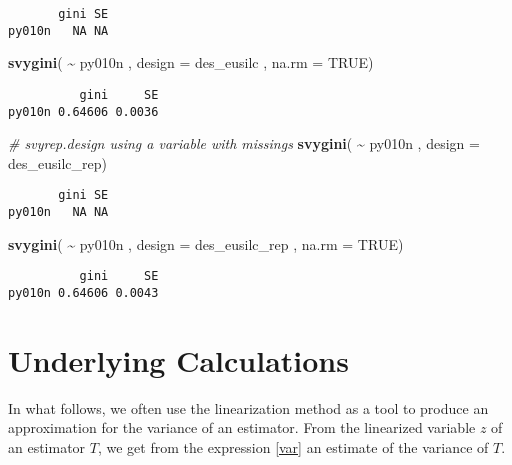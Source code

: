 \documentclass[
]{book}
\newenvironment{Shaded}{\begin{snugshade}}{\end{snugshade}}
\newcommand{\AttributeTok}[1]{\textcolor[rgb]{0.13,0.29,0.53}{#1}}
\newcommand{\CommentTok}[1]{\textcolor[rgb]{0.56,0.35,0.01}{\textit{#1}}}
\newcommand{\ConstantTok}[1]{\textcolor[rgb]{0.56,0.35,0.01}{#1}}
\newcommand{\FunctionTok}[1]{\textcolor[rgb]{0.13,0.29,0.53}{\textbf{#1}}}
\newcommand{\NormalTok}[1]{#1}
\newcommand{\SpecialCharTok}[1]{\textcolor[rgb]{0.81,0.36,0.00}{\textbf{#1}}}
\begin{document}
\begin{verbatim}
       gini SE
py010n   NA NA
\end{verbatim}

\begin{Shaded}
\begin{Highlighting}[]
\FunctionTok{svygini}\NormalTok{( }\SpecialCharTok{\textasciitilde{}}\NormalTok{ py010n , }\AttributeTok{design =}\NormalTok{ des\_eusilc , }\AttributeTok{na.rm =} \ConstantTok{TRUE}\NormalTok{)}
\end{Highlighting}
\end{Shaded}

\begin{verbatim}
          gini     SE
py010n 0.64606 0.0036
\end{verbatim}

\begin{Shaded}
\begin{Highlighting}[]
\CommentTok{\# svyrep.design using a variable with missings}
\FunctionTok{svygini}\NormalTok{( }\SpecialCharTok{\textasciitilde{}}\NormalTok{ py010n , }\AttributeTok{design =}\NormalTok{ des\_eusilc\_rep)}
\end{Highlighting}
\end{Shaded}

\begin{verbatim}
       gini SE
py010n   NA NA
\end{verbatim}

\begin{Shaded}
\begin{Highlighting}[]
\FunctionTok{svygini}\NormalTok{( }\SpecialCharTok{\textasciitilde{}}\NormalTok{ py010n , }\AttributeTok{design =}\NormalTok{ des\_eusilc\_rep , }\AttributeTok{na.rm =} \ConstantTok{TRUE}\NormalTok{)}
\end{Highlighting}
\end{Shaded}

\begin{verbatim}
          gini     SE
py010n 0.64606 0.0043
\end{verbatim}

\hypertarget{lin}{%
\section{Underlying Calculations}\label{lin}}

In what follows, we often use the linearization method as a tool to produce an approximation for the variance of an estimator. From the linearized variable \(z\) of an estimator \(T\), we get from the expression \ref{var} an estimate of the variance of \(T\).
\end{document}
